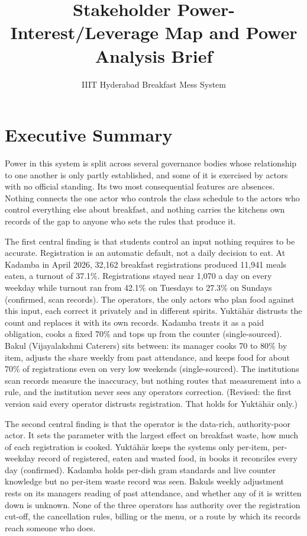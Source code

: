 \documentclass[
  10pt,
  table]{article}
\title{Stakeholder Power-Interest/Leverage Map and Power Analysis Brief}
\subtitle{IIIT Hyderabad Breakfast Mess System}
\author{}
\date{}
\makeatletter
\gdef\psubtitle{}
\renewcommand{\maketitle}{%
  \begingroup\raggedright
  {\color{pblue}\fontsize{24}{27}\selectfont\bfseries \@title\par}
  \vspace{3pt}{\color{pblue}\rule{\linewidth}{2.4pt}}\par\vspace{5pt}
  {\color{pslate}\large \psubtitle\par}
  \vspace{4pt}
  \endgroup}
\makeatother
\begin{document}
\maketitle

\renewcommand*\contentsname{Contents}
{
\hypersetup{linkcolor=pslate}
\setcounter{tocdepth}{2}
\tableofcontents
}
\section{Executive Summary}\label{executive-summary}

Power in this system is split across several governance bodies whose relationship to one another is only partly established, and some of it is exercised by actors with no official standing. Its two most consequential features are absences. Nothing connects the one actor who controls the class schedule to the actors who control everything else about breakfast, and nothing carries the kitchens\textquotesingle{} own records of the gap to anyone who sets the rules that produce it.

The first central finding is that students control an input nothing requires to be accurate. Registration is an automatic default, not a daily decision to eat. At Kadamba in April 2026, 32,162 breakfast registrations produced 11,941 meals eaten, a turnout of 37.1\%. Registrations stayed near 1,070 a day on every weekday while turnout ran from 42.1\% on Tuesdays to 27.3\% on Sundays (confirmed, scan records). The operators, the only actors who plan food against this input, each correct it privately and in different spirits. Yuktāhār distrusts the count and replaces it with its own records. Kadamba treats it as a paid obligation, cooks a fixed 70\% and tops up from the counter (single-sourced). Bakul (Vijayalakshmi Caterers) sits between: its manager cooks 70 to 80\% by item, adjusts the share weekly from past attendance, and keeps food for about 70\% of registrations even on very low weekends (single-sourced). The institution\textquotesingle s scan records measure the inaccuracy, but nothing routes that measurement into a rule, and the institution never sees any operator\textquotesingle s correction. (Revised: the first version said every operator distrusts registration. That holds for Yuktāhār only.)

The second central finding is that the operator is the data-rich, authority-poor actor. It sets the parameter with the largest effect on breakfast waste, how much of each registration is cooked. Yuktāhār keeps the system\textquotesingle s only per-item, per-weekday record of registered, eaten and wasted food, in books it reconciles every day (confirmed). Kadamba holds per-dish gram standards and live counter knowledge but no per-item waste record was seen. Bakul\textquotesingle s weekly adjustment rests on its manager\textquotesingle s reading of past attendance, and whether any of it is written down is unknown. None of the three operators has authority over the registration cut-off, the cancellation rules, billing or the menu, or a route by which its records reach someone who does.
\end{document}
